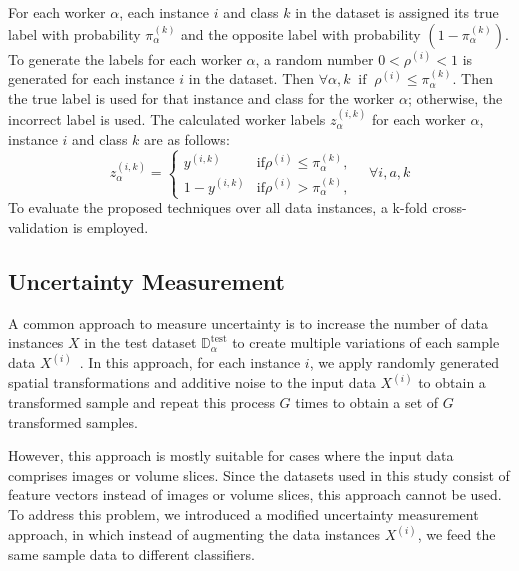 For each worker $\alpha $, each instance $i $ and class $k $ in the dataset is assigned its true label with probability $\pi_\alpha^{(k)}$ and the opposite label with probability $ (1-\pi_\alpha^{(k)})$. To generate the labels for each worker $\alpha $, a random number $0 < \rho^{(i)} < 1 $ is generated for each instance $i $ in the dataset. Then $\forall \alpha,k \; \; \text{if} \; \; \rho^{(i)}\leq \pi_\alpha^{(k)}$. Then the true label is used for that instance and class for the worker $\alpha $; otherwise, the incorrect label is used.
The calculated worker labels $z_{\alpha}^{(i,k)} $ for each worker $\alpha $, instance $i $ and class $k $ are as follows:
\begin{equation}
    z_{\alpha}^{(i,k)} =
    \begin{cases}
        y^{(i,k)} & \text{if} \rho^{(i)}  \leq \pi_\alpha^{(k)} , \\
        1 - y^{(i,k)} & \text{if} \rho^{(i)} > \pi_\alpha^{(k)} ,
    \end{cases} \quad \forall i, a, k
    \label{eq:crowd.Eq.4.fictitious_label}
\end{equation}
To evaluate the proposed techniques over all data instances, a k-fold cross-validation is employed.

\subsection{Uncertainty Measurement}\label{subsec:crowd.uncertainty}

A common approach to measure uncertainty is to increase the number of data instances $X $ in the test dataset $\mathbb{D}_\alpha^{\mathrm{test}} $ to create multiple variations of each sample data $X^{(i)} $~\cite{ayhan_TestTime_2018}. In this approach, for each instance $i $, we apply randomly generated spatial transformations and additive noise to the input data $X^{(i)} $ to obtain a transformed sample and repeat this process $G $ times to obtain a set of $G $ transformed samples.

However, this approach is mostly suitable for cases where the input data comprises images or volume slices. Since the datasets used in this study consist of feature vectors instead of images or volume slices, this approach cannot be used. To address this problem, we introduced a modified uncertainty measurement approach, in which instead of augmenting the data instances $X^{(i)} $, we feed the same sample data to different classifiers.

